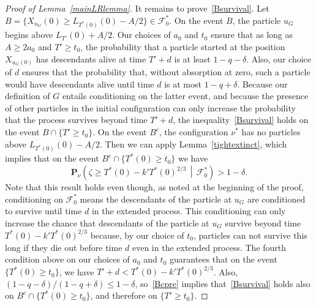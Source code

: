 \documentclass[10pt]{amsart}
\theoremstyle{definition}\newtheorem{defi}[theo]{Definition}\newtheorem{rema}[theo]{Remark}\newtheorem{exam}[theo]{Example}\newtheorem{exem}[theo]{Example}\newtheorem{nota}[theo]{Notation}
\renewcommand*\P{\mathbf{P}}
\newcommand\F{\mathcal{F}}
\newcommand{\1} {\mathds{1}}
\begin{document}
\begin{proof}[Proof of Lemma~\ref{mainLRlemma}]
It remains to prove~\eqref{Bsurvival}. Let $B = \{X_{u_G}(0) \geq L_{T^*(0)}(0) - A/2\} \in \F_0^*$. On the event $B$, the particle $u_G$ begins above $L_{T'}(0) + A/2$. Our choices of $a_0$ and $t_0$ ensure that as long as $A \geq 2 a_0$ and $T' \geq t_0$, the probability that a particle started at the position $X_{u_G(0)}$ has descendants alive at time $T' + d$ is at least $1 - q - \delta$. Also, our choice of $d$ ensures that the probability that, without absorption at zero, such a particle would have descendants alive until time $d$ is at most $1 - q + \delta$. Because our definition of $G$ entails conditioning on the latter event, and because the presence of other particles in the initial configuration can only increase the probability that the process survives beyond time $T' + d$, the inequality~\eqref{Bsurvival} holds on the event $B \cap \{T' \geq t_0\}$. On the event $B^c$, the configuration $\nu^*$ has no particles above $L_{T^*(0)}(0) - A/2$. Then we can apply Lemma~\ref{tightextinct}, which implies that on the event $B^c \cap \{T^*(0) \geq t_0\}$ we have
\begin{equation}\label{Bcpre}
\P_{\nu}\left(\zeta \geq T^*(0) - k' T^*(0)^{2/3} \,\middle|\, \F_0^*\right) > 1 - \delta.
\end{equation}
Note that this result holds even though, as noted at the beginning of the proof, conditioning on $\F_0^*$ means the descendants of the particle at $u_G$ are conditioned to survive until time $d$ in the extended process. This conditioning can only increase the chance that descendants of the particle at $u_G$ survive beyond time $T^*(0) - k' T^*(0)^{2/3}$ because, by our choice of $t_0$, particles can not survive this long if they die out before time $d$ even in the extended process. The fourth condition above on our choices of $a_0$ and $t_0$ guarantees that on the event $\{T^*(0) \geq t_0\}$, we have $T' + d < T^*(0) - k' T^*(0)^{2/3}$. Also, $(1 - q - \delta)/(1 - q + \delta) \leq 1 - \delta$, so~\eqref{Bcpre} implies that~\eqref{Bsurvival} holds also on $B^c \cap \{T^*(0) \geq t_0\}$, and therefore on $\{T' \geq t_0\}$.
\end{proof}
\end{document}
